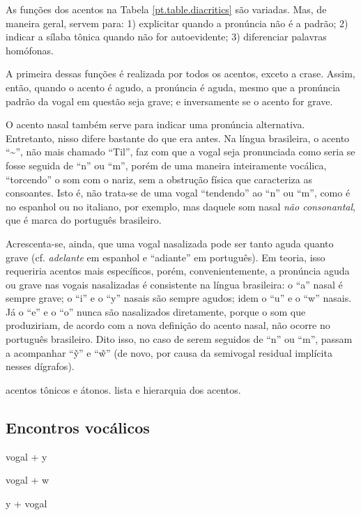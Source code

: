 \documentclass[12pt, a5paper, titlepage]{article}
\begin{document}
\begin{bilingualpages}
    \PtTableDiacritics

    As funções dos acentos na Tabela \ref{pt.table.diacritics} são variadas. Mas,
    de maneira geral, servem para: 1) explicitar quando a pronúncia não é a padrão;
    2) indicar a sílaba tônica quando não for autoevidente; 3) diferenciar palavras
    homófonas.

    A primeira dessas funções é realizada por todos os acentos, exceto a crase.
    Assim, então, quando o acento é agudo, a pronúncia é aguda, mesmo que a
    pronúncia padrão da vogal em questão seja grave; e inversamente se o acento for
    grave.

    O acento nasal também serve para indicar uma pronúncia alternativa. Entretanto,
    nisso difere bastante do que era antes. Na língua brasileira, o acento
    ``\textasciitilde'', não mais chamado ``Til'', faz com que a vogal seja
    pronunciada como seria se fosse seguida de ``n'' ou ``m'', porém de uma maneira
    inteiramente vocálica, ``torcendo'' o som com o nariz, sem a obstrução física
    que caracteriza as consoantes. Isto é, não trata-se de uma vogal ``tendendo''
    ao ``n'' ou ``m'', como é no espanhol ou no italiano, por exemplo, mas daquele
    som nasal \textit{não consonantal}, que é marca do português brasileiro.

    Acrescenta-se, ainda, que uma vogal nasalizada pode ser tanto aguda quanto
    grave (cf. \textit{adelante} em espanhol e ``adiante'' em português). Em
    teoria, isso requeriria acentos mais específicos, porém, convenientemente, a
    pronúncia aguda ou grave nas vogais nasalizadas é consistente na língua
    brasileira: o ``a'' nasal é sempre grave; o ``i'' e o ``y'' nasais são sempre
    agudos; idem o ``u'' e o ``w'' nasais. Já o ``e'' e o ``o'' nunca são
    nasalizados diretamente, porque o som que produziriam, de acordo com a nova
    definição do acento nasal, não ocorre no português brasileiro. Dito isso, no
    caso de serem seguidos de ``n'' ou ``m'', passam a acompanhar ``\~y'' e ``\~w''
    (de novo, por causa da semivogal residual implícita nesses dígrafos).

    acentos tônicos e átonos. lista e hierarquia dos acentos.

    \subsection{Encontros vocálicos}
    vogal + y

    vogal + w

    y + vogal


\end{bilingualpages}
\end{document}
